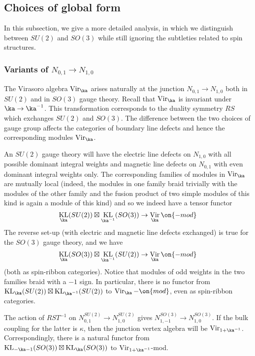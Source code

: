 \documentclass[11pt,reqno]{amsart}
\theoremstyle{plain}
\numberwithin{equation}{section}
\DeclareMathOperator{\Vir}{Vir}
\DeclareMathOperator{\KL}{KL}
\theoremstyle{definition}
\begin{document}
\subsection{Choices of global form}    \label{global}

In this subsection, we give a more detailed analysis, in which we
distinguish between $SU(2)$ and $SO(3)$ while still ignoring the
subtleties related to spin structures.

\subsubsection{Variants of $N_{0,1} \to N_{1,0}$}
The Virasoro algebra $\Vir_\ka$ arises naturally at the junction
$N_{0,1} \to N_{1,0}$ both in $SU(2)$ and in $SO(3)$ gauge
theory. Recall that $\Vir_\ka$ is invariant under $\ka\to
\ka^{-1}$. This transformation corresponds to the duality symmetry
$RS$ which exchanges $SU(2)$ and $SO(3)$.  The difference between the
two choices of gauge group affects the categories of boundary line
defects and hence the corresponding modules $\Vir_\ka$.

An $SU(2)$ gauge theory will have the electric line defects on
$N_{1,0}$ with all possible dominant integral weights and magnetic
line defects on $N_{0,1}$ with even dominant integral weights only.
The corresponding families of modules in $\Vir_\ka$ are mutually local
(indeed, the modules in one family braid trivially with the modules of
the other family and the fusion product of two simple modules of this
kind is again a module of this kind) and so we indeed have a tensor functor
$$
\KL_\ka(SU(2)) \boxtimes \KL_{\ka^{-1}}(SO(3)) \to \Vir_\ka\on{-mod}
$$
The reverse set-up (with electric and magnetic line defects exchanged)
is true for the $SO(3)$ gauge theory, and we have
$$
\KL_\ka(SO(3)) \boxtimes \KL_{\ka^{-1}}(SU(2)) \to \Vir_\ka\on{-mod}
$$
(both as spin-ribbon categories). Notice that modules of odd weights
in the two families braid with a $-1$ sign. In particular, there is no
functor from $\KL_\ka(SU(2)) \boxtimes \KL_{\ka^{-1}}(SU(2))$ to
$\Vir_\ka-\on{mod}$, even as spin-ribbon categories.

The action of $RST^{-1}$ on $N^{SU(2)}_{0,1} \to N^{SU(2)}_{1,0}$ 
gives $N^{SO(3)}_{1,-1} \to N^{SO(3)}_{1,0}$. If the bulk coupling 
for the latter is $\kappa$, then the junction vertex algebra will be 
$\Vir_{1+\ka^{-1}}$. Correspondingly, there is a natural functor 
from $\KL_{-\ka-1}(SO(3)) \boxtimes \KL_{\ka}(SO(3))$ to $\Vir_{1+\ka^{-1}}$-mod.
\end{document}
